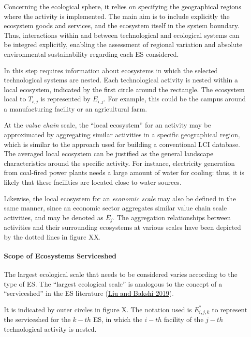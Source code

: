 \documentclass[
  14pt,
]{extarticle}
\begin{document}
Concerning the ecological sphere, it relies on specifying the geographical regions where the activity is implemented.
The main aim is to include explicitly the ecosystem goods and services, and the ecosystem itself in the system boundary.
Thus, interactions within and between technological and ecological systems can be integred explicitly, enabling the assessment of regional variation and absolute environmental sustainability regarding each ES considered.

In this step requires information about ecosystems in which the selected technological systems are nested.
Each technological activity is nested within a local ecosystem, indicated by the first circle around the rectangle.
The ecosystem local to \(T_{i,j}\) is represented by \(E_{i,j}\).
For example, this could be the campus around a manufacturing facility or an agricultural farm.

At the \emph{value chain} scale, the ``local ecosystem'' for an activity may be approximated by aggregating similar activities in a specific geographical region, which is similar to the approach used for building a conventional LCI database.
The averaged local ecosystem can be justified as the general landscape characteristics around the specific activity.
For instance, electricity generation from coal-fired power plants needs a large amount of water for cooling: thus, it is likely that these facilities are located close to water sources.

Likewise, the local ecosystem for an \emph{economic scale} may also be defined in the same manner, since an economic sector aggregates similar value chain scale activities, and may be denoted as \(\overline{E}_{j}\).
The aggregation relationships between activities and their surrounding ecosystems at various scales have been depicted by the dotted lines in figure XX.

\hypertarget{scope-of-ecosystems-serviceshed}{%
\paragraph{Scope of Ecosystems Serviceshed}\label{scope-of-ecosystems-serviceshed}}

The largest ecological scale that needs to be considered varies according to the type of ES.
The ``largest ecological scale'' is analogous to the concept of a ``serviceshed'' in the ES literature (\protect\hyperlink{ref-Liu2019g}{Liu and Bakshi 2019}).

It is indicated by outer circles in figure X.
The notation used is \(E^{*}_{i,j,k}\) to represent the serviceshed for the \(k-th\) ES, in which the \(i-th\) facility of the \(j-th\) technological activity is nested.
\end{document}

